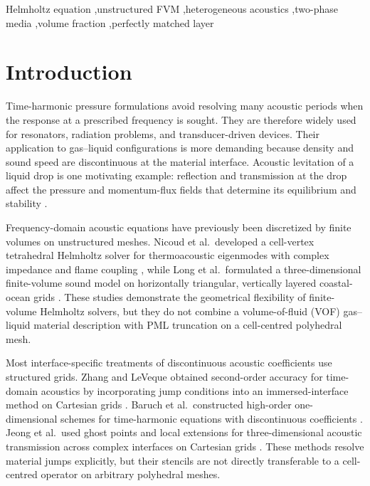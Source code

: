 \documentclass[final,12pt,nopreprintline,longtitle]{elsarticle}
\begin{document}
\begin{frontmatter}
\begin{keyword}
Helmholtz equation \sep unstructured FVM \sep heterogeneous acoustics
\sep two-phase media \sep volume fraction \sep perfectly matched layer
\end{keyword}

\end{frontmatter}

\linenumbers

\section{Introduction}
\label{sec:intro}

Time-harmonic pressure formulations avoid resolving many acoustic periods when
the response at a prescribed frequency is sought.  They are therefore widely
used for resonators, radiation problems, and transducer-driven devices.  Their
application to gas--liquid configurations is more demanding because density and
sound speed are discontinuous at the material interface.  Acoustic levitation of a
liquid drop is one motivating example: reflection and transmission at the drop
affect the pressure and momentum-flux fields that determine its equilibrium and
stability \cite{andrade2019numerical}.

Frequency-domain acoustic equations have previously been discretized by finite
volumes on unstructured meshes.  Nicoud et al.\ developed a cell-vertex
tetrahedral Helmholtz solver for thermoacoustic eigenmodes with complex
impedance and flame coupling \cite{Nicoud2007}, while Long et al.\ formulated a
three-dimensional finite-volume sound model on horizontally triangular,
vertically layered coastal-ocean grids \cite{Long2015}.  These studies
demonstrate the geometrical flexibility of finite-volume Helmholtz solvers, but
they do not combine a volume-of-fluid (VOF) gas--liquid material description
with PML truncation on a cell-centred polyhedral mesh.

Most interface-specific treatments of discontinuous acoustic coefficients use
structured grids.  Zhang and LeVeque obtained second-order accuracy for
time-domain acoustics by incorporating jump conditions into an
immersed-interface method on Cartesian grids \cite{ZhangLeVeque1997}.  Baruch
et al.\ constructed high-order one-dimensional schemes for time-harmonic
equations with discontinuous coefficients \cite{Baruch2009}.  Jeong et al.\ used
ghost points and local extensions for three-dimensional acoustic transmission
across complex interfaces on Cartesian grids \cite{Jeong2021}.  These methods
resolve material jumps explicitly, but their stencils are not directly
transferable to a cell-centred operator on arbitrary polyhedral meshes.
\end{document}
